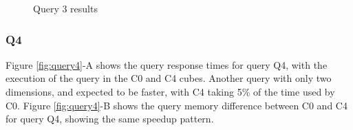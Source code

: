 \begin{figure}[H]
  \caption{Query 3 results}\label{fig:query3}
  \vspace{6mm}
  \begin{center}
  \end{center}
  \vspace{2mm}
\end{figure}

\hypertarget{q4-1}{%
\subsubsection{Q4}\label{q4-1}}

Figure \ref{fig:query4}-A shows the query response times for query Q4, with the execution of the query in the C0 and C4 cubes.
Another query with only two dimensions, and expected to be faster, with C4 taking 5\% of the time used by C0.
Figure \ref{fig:query4}-B shows the query memory difference between C0 and C4 for query Q4, showing the same speedup pattern.

